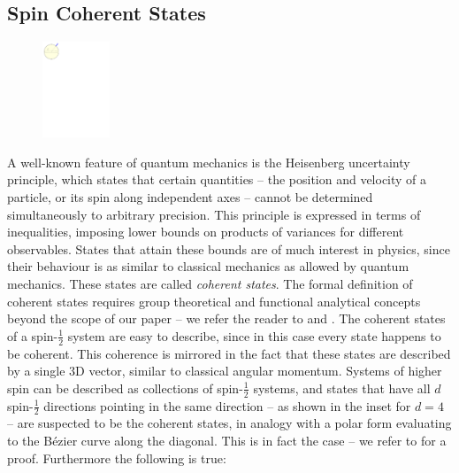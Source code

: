 \documentclass[12pt,final,3p]{elsarticle}
\begin{document}
\subsection{Spin Coherent States}\label{sec:spinfacts:coherent}
\begingroup
\setlength{\columnsep}{6pt}
\setlength{\intextsep}{0pt}
\begin{figure}
	\includegraphics[width=0.18\textwidth, keepaspectratio]{figures/majorana_coherent.pdf}
	\label{fig:cylinder}
\end{figure}
A well-known feature of quantum mechanics is the Heisenberg uncertainty principle, which states that certain quantities -- the position and velocity of a particle, or its spin along independent axes --  cannot be determined simultaneously to arbitrary precision. This principle is expressed in terms of inequalities, imposing lower bounds on products of variances for different observables. States that attain these bounds are of much interest in physics, since their behaviour is as similar to classical mechanics as allowed by quantum mechanics. These states are called \emph{coherent states}. The formal definition of coherent states requires group theoretical and functional analytical concepts beyond the scope of our paper -- we refer the reader to \cite{gazeau2009coherent,combescure2012coherent} and \cite{bengtsson2006geometry}. The coherent states of a spin-$\frac{1}{2}$ system are easy to describe, since in this case every state happens to be coherent. This coherence is mirrored in the fact that these states are described by a single 3D vector, similar to classical angular momentum. Systems of higher spin can be described as collections of spin-$\frac{1}{2}$ systems, and states that have all $d$ spin-$\frac{1}{2}$ directions pointing in the same direction -- as shown in the inset for $d = 4$ -- are suspected to be the coherent states, in analogy with a polar form evaluating to the B\'{e}zier curve along the diagonal. This is in fact the case -- we refer to \cite[Ch. 7.2.]{bengtsson2006geometry} for a proof. Furthermore the following is true:
\end{document}
